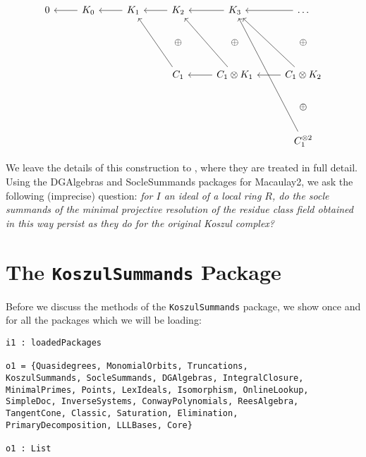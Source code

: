 \documentclass[twoside,12pt, leqno]{amsart}
\begin{document}
\[\begin{tikzcd}
	0 & {K_0} & {K_1} & {K_2} & {K_3} & \ldots \\
	&&& \oplus & \oplus & \oplus \\
	&&& {C_1} & {C_1 \otimes K_1} & {C_1 \otimes K_2} \\
	&&&&& \oplus \\
	&&&&& {C_1^{\otimes 2}}
	\arrow[from=1-2, to=1-1]
	\arrow[from=1-3, to=1-2]
	\arrow[from=1-4, to=1-3]
	\arrow[from=1-5, to=1-4]
	\arrow[from=3-4, to=1-3]
	\arrow[from=3-5, to=3-4]
	\arrow[from=1-6, to=1-5]
	\arrow[from=3-6, to=3-5]
	\arrow[from=3-6, to=1-5]
	\arrow[from=3-5, to=1-4]
	\arrow[from=5-6, to=1-5]
\end{tikzcd}\]

We leave the details of this construction to \cite{GL69}, where they are treated in full detail. Using the DGAlgebras and SocleSummands packages for Macaulay2, we ask the following (imprecise) question: \textit{for $I$ an ideal of a local ring $R$, do the socle summands of the minimal projective resolution of the residue class field obtained in this way persist as they do for the original Koszul complex?} 

\section{The \texttt{KoszulSummands} Package}

Before we discuss the methods of the \texttt{KoszulSummands} package, we show once and for all the packages which we will be loading:

\begin{footnotesize}
\begin{verbatim}
i1 : loadedPackages

o1 = {Quasidegrees, MonomialOrbits, Truncations, 
KoszulSummands, SocleSummands, DGAlgebras, IntegralClosure, 
MinimalPrimes, Points, LexIdeals, Isomorphism, OnlineLookup, 
SimpleDoc, InverseSystems, ConwayPolynomials, ReesAlgebra, 
TangentCone, Classic, Saturation, Elimination, 
PrimaryDecomposition, LLLBases, Core}

o1 : List
\end{verbatim}
\end{footnotesize}
\end{document}
